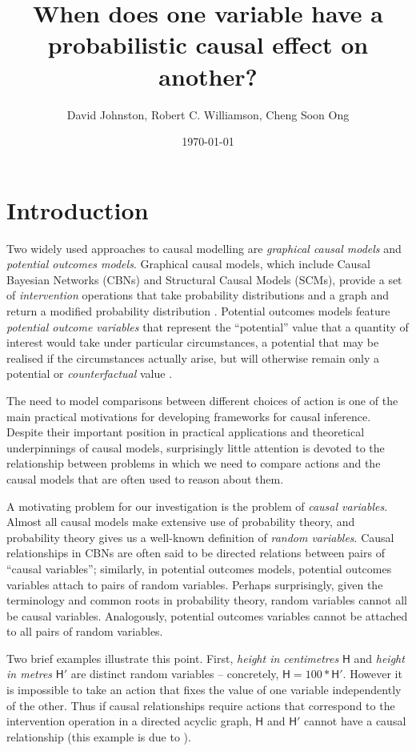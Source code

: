 \documentclass{article}
\title{When does one variable have a probabilistic causal effect on another?}
\date{\today}
\author{ David Johnston, Robert C. Williamson, Cheng Soon Ong }
\theoremstyle{plain}
\theoremstyle{definition}
\newcommand{\RV}[1]{\ensuremath{\mathsf{#1}}}
\begin{document}
\maketitle


\tableofcontents


\section{Introduction}

Two widely used approaches to causal modelling are \emph{graphical causal models} and \emph{potential outcomes models}. Graphical causal models, which include Causal Bayesian Networks (CBNs) and Structural Causal Models (SCMs), provide a set of \emph{intervention} operations that take probability distributions and a graph and return a modified probability distribution \citep{pearl_causality:_2009}. Potential outcomes models feature \emph{potential outcome variables} that represent the ``potential'' value that a quantity of interest would take under particular circumstances, a potential that may be realised if the circumstances actually arise, but will otherwise remain only a potential or \emph{counterfactual} value \citep{rubin_causal_2005}.

The need to model comparisons between different choices of action is one of the main practical motivations for developing frameworks for causal inference. Despite their important position in practical applications and theoretical underpinnings of causal models, surprisingly little attention is devoted to the relationship between problems in which we need to compare actions and the causal models that are often used to reason about them. 

A motivating problem for our investigation is the problem of \emph{causal variables}. Almost all causal models make extensive use of probability theory, and probability theory gives us a well-known definition of \emph{random variables}. Causal relationships in CBNs are often said to be directed relations between pairs of ``causal variables''; similarly, in potential outcomes models, potential outcomes variables attach to pairs of random variables. Perhaps surprisingly, given the terminology and common roots in probability theory, random variables cannot all be causal variables. Analogously, potential outcomes variables cannot be attached to all pairs of random variables.

Two brief examples illustrate this point. First, \emph{height in centimetres} $\RV{H}$ and \emph{height in metres} $\RV{H}'$ are distinct random variables -- concretely, $\RV{H}=100*\RV{H}'$. However it is impossible to take an action that fixes the value of one variable independently of the other. Thus if causal relationships require actions that correspond to the intervention operation in a directed acyclic graph, $\RV{H}$ and $\RV{H}'$ cannot have a causal relationship (this example is due to \citet{eberhardt_contemporary_2022}).
\end{document}
